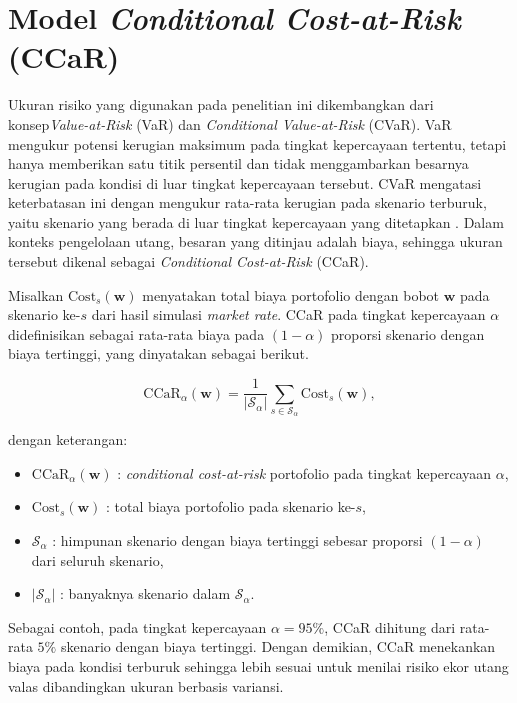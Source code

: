 \section{Model \textit{Conditional Cost-at-Risk} (CCaR)}\label{sec:ccar}
Ukuran risiko yang digunakan pada penelitian ini dikembangkan dari konsep\textit{Value-at-Risk} (VaR) dan \textit{Conditional Value-at-Risk} (CVaR). VaR mengukur potensi kerugian maksimum pada tingkat kepercayaan tertentu, tetapi hanya memberikan satu titik persentil dan tidak menggambarkan besarnya kerugian pada kondisi di luar tingkat kepercayaan tersebut. CVaR mengatasi keterbatasan ini dengan mengukur rata-rata kerugian pada skenario terburuk, yaitu skenario yang berada di luar tingkat kepercayaan yang ditetapkan . Dalam konteks pengelolaan utang, besaran yang ditinjau adalah biaya, sehingga ukuran tersebut dikenal sebagai \textit{Conditional Cost-at-Risk} (CCaR).

Misalkan $\mathrm{Cost}_s(\mathbf{w})$ menyatakan total biaya portofolio dengan bobot $\mathbf{w}$ pada skenario ke-$s$ dari hasil simulasi \textit{market rate}. CCaR pada tingkat kepercayaan $\alpha$ didefinisikan sebagai rata-rata biaya pada $(1-\alpha)$ proporsi skenario dengan biaya tertinggi, yang dinyatakan sebagai berikut.

\begin{equation}
    \label{eq:ccar}
    \mathrm{CCaR}_\alpha(\mathbf{w}) = \frac{1}{|\mathcal{S}_\alpha|} \sum_{s\in\mathcal{S}_\alpha} \mathrm{Cost}_s(\mathbf{w}),
\end{equation}

dengan keterangan:
\begin{itemize}
    \item $\mathrm{CCaR}_\alpha(\mathbf{w})$ : \textit{conditional cost-at-risk} portofolio pada tingkat kepercayaan $\alpha$,
    \item $\mathrm{Cost}_s(\mathbf{w})$ : total biaya portofolio pada skenario ke-$s$,
    \item $\mathcal{S}_\alpha$ : himpunan skenario dengan biaya tertinggi sebesar proporsi $(1-\alpha)$ dari seluruh skenario,
    \item $|\mathcal{S}_\alpha|$ : banyaknya skenario dalam $\mathcal{S}_\alpha$.
\end{itemize}

Sebagai contoh, pada tingkat kepercayaan $\alpha = 95\%$, CCaR dihitung dari rata-rata $5\%$ skenario dengan biaya tertinggi. Dengan demikian, CCaR menekankan biaya pada kondisi terburuk sehingga lebih sesuai untuk menilai risiko ekor utang valas dibandingkan ukuran berbasis variansi.

